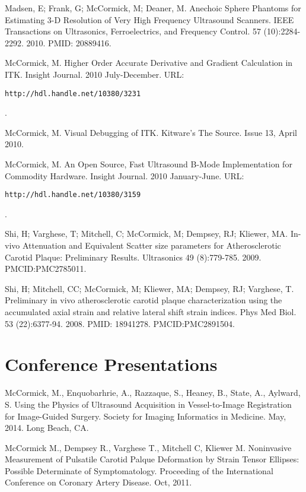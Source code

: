 \documentclass[margin,line]{res}
\begin{document}
\begin{resume}
Madsen, E; Frank, G; McCormick, M; Deaner, M.  Anechoic Sphere Phantoms for
Estimating 3-D Resolution of Very High Frequency Ultrasound Scanners.
IEEE Transactions on Ultrasonics, Ferroelectrics, and Frequency Control. 57
(10):2284-2292. 2010.  PMID: 20889416.

McCormick, M.  Higher Order Accurate Derivative and Gradient Calculation in ITK.
Insight Journal.  2010 July-December.
\vspace*{-.25in}
URL: \begin{verbatim}http://hdl.handle.net/10380/3231\end{verbatim}.
\vspace*{-.35in}

McCormick, M.  Visual Debugging of ITK.  Kitware's The Source.  Issue 13, April
2010.

McCormick, M.  An Open Source, Fast Ultrasound B-Mode Implementation for
Commodity Hardware.  Insight Journal.  2010 January-June.
\vspace*{-.25in}
URL: \begin{verbatim}http://hdl.handle.net/10380/3159\end{verbatim}.
\vspace*{-.35in}

Shi, H; Varghese, T; Mitchell, C; McCormick, M; Dempsey, RJ; Kliewer, MA.
In-vivo Attenuation and Equivalent Scatter size parameters for Atherosclerotic
Carotid Plaque: Preliminary Results.  Ultrasonics 49 (8):779-785.  2009.
PMCID:PMC2785011.

Shi, H; Mitchell, CC; McCormick, M; Kliewer, MA; Dempsey, RJ; Varghese, T.
Preliminary in vivo atherosclerotic carotid plaque characterization
using the accumulated axial strain and relative lateral shift strain
indices.  Phys Med Biol. 53 (22):6377-94. 2008. PMID:
18941278.  PMCID:PMC2891504.

\section{\sc Conference Presentations}

McCormick, M., Enquobarhrie, A., Razzaque, S., Heaney, B., State, A., Aylward,
S. Using the Physics of Ultrasound Acquisition in Vessel-to-Image Registration
for Image-Guided Surgery.  Society for Imaging Informatics in Medicine.  May,
2014. Long Beach, CA.

McCormick M., Dempsey R., Varghese T., Mitchell C, Kliewer M.  Noninvasive
Measurement of Pulsatile Carotid Palque Deformation by Strain Tensor Ellipses:
Possible Determinate of Symptomatology.  Proceeding of the International
Conference on Coronary Artery Disease.  Oct, 2011.


\end{resume}
\end{document}
